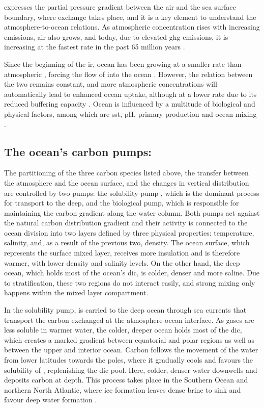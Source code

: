  expresses the  partial pressure gradient between the air and the sea surface boundary, where  exchange takes place, and it is a key element to understand the atmosphere-to-ocean relations. As atmospheric  concentration rises with increasing emissions, air  also grows, and today, due to elevated \ac{ghg} emissions, it is increasing at the fastest rate in the past 65 million years \citep{watson2017quantifying}. 

Since the beginning of the \ac{ir}, ocean  has been growing at a smaller rate than atmospheric , forcing the flow of  into the ocean \citep{lenton2012observed}. However, the relation between the two remains constant, and more atmospheric  concentrations will automatically lead to enhanced ocean uptake, although at a lower rate due to its reduced buffering capacity \citep{chikamoto2023long}. Ocean  is influenced by a multitude of biological and physical factors, among which are \ac{sst}, pH, primary production and ocean mixing \citep{fassbender2022quantifying, kheshgi1995sequestering}. 

\subsection{The ocean's carbon pumps:}

The partitioning of the three carbon species listed above, the  transfer between the atmosphere and the ocean surface, and the changes in vertical distribution are controlled by two pumps: the solubility pump \citep{heinze2015ocean}, which is the dominant process for  transport to the deep, and the biological pump, which is responsible for maintaining the carbon gradient along the water column. Both pumps act against the natural carbon distribution gradient and their activity is connected to the ocean division into two layers defined by three physical properties: temperature, salinity, and, as a result of the previous two, density. The ocean surface, which represents the surface mixed layer, receives more insulation and is therefore warmer, with lower density and salinity levels. On the other hand, the deep ocean, which holds most of the ocean's \ac{dic}, is colder, denser and more saline. Due to stratification, these two regions do not interact easily, and strong mixing only happens within the mixed layer compartment. 

In the solubility pump,  is carried to the deep ocean through sea currents that transport the carbon exchanged at the atmosphere-ocean interface. As gases are less soluble in warmer water, the colder, deeper ocean holds most of the \ac{dic}, which creates a marked gradient between equatorial and polar regions as well as between the upper and interior ocean. Carbon follows the movement of the water from lower latitudes towards the poles, where it gradually cools and favours the solubility of , replenishing the \ac{dic} pool. Here, colder, denser water downwells and deposits carbon at depth. This process takes place in the Southern Ocean and northern North Atlantic, where ice formation leaves dense brine to sink and favour deep water formation \citep{reid2009impacts}. 

